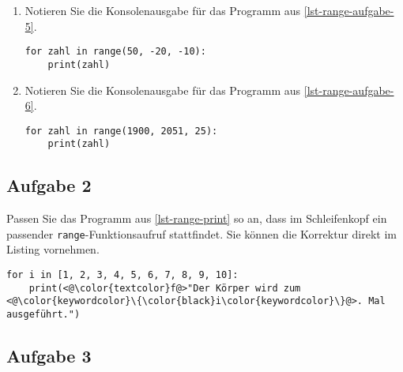 \begin{enumerate}
\item Notieren Sie die Konsolenausgabe für das Programm aus \autoref{lst-range-aufgabe-5}.

\begin{minipage}[c][1in][c]{0.35\textwidth}
\fillwithgrid{0.9in}
\end{minipage}
\hfill
\begin{minipage}[c][0.75in][c]{0.6\textwidth}
\begin{lstlisting}[caption={Aufgabe 5}, label={lst-range-aufgabe-5}]
for zahl in range(50, -20, -10):
    print(zahl)
\end{lstlisting}
\end{minipage}

\item Notieren Sie die Konsolenausgabe für das Programm aus \autoref{lst-range-aufgabe-6}.

\begin{minipage}[c][1in][c]{0.35\textwidth}
\fillwithgrid{0.9in}
\end{minipage}
\hfill
\begin{minipage}[c][0.75in][c]{0.6\textwidth}
\begin{lstlisting}[caption={Aufgabe 5}, label={lst-range-aufgabe-6}]
for zahl in range(1900, 2051, 25):
    print(zahl)
\end{lstlisting}
\end{minipage}

\end{enumerate}

\subsection{Aufgabe 2}

Passen Sie das Programm aus \autoref{lst-range-print} so an, dass im Schleifenkopf ein passender \lstinline{range}-Funktionsaufruf stattfindet. Sie können die Korrektur direkt im Listing vornehmen.

\vspace{0.5cm}

\begin{lstlisting}[caption={Ersetzen Sie den Schleifenkopf.}, label={lst-range-print}]
for i in [1, 2, 3, 4, 5, 6, 7, 8, 9, 10]:
    print(<@\color{textcolor}f@>"Der Körper wird zum <@\color{keywordcolor}\{\color{black}i\color{keywordcolor}\}@>. Mal ausgeführt.")
\end{lstlisting}

\subsection{Aufgabe 3}

